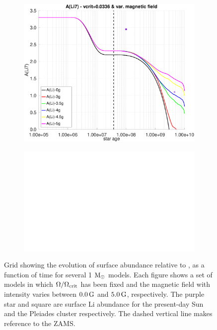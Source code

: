 \documentclass[fleqn,usenatbib]{mnras}
\begin{document}
\begin{figure}
\begin{subfigure}[h]{0.47\textwidth}
    \includegraphics[trim = 25mm 10mm 15mm 10mm, clip,width=\textwidth]{figures/li_vc_0336_var_g.eps}
    \label{fig:subim25}
    \end{subfigure}
    \begin{subfigure}[h]{0.47\textwidth}
    \includegraphics[width=\textwidth]{figures/blank.eps}
    \label{fig:subim26}
    \end{subfigure}
\caption{Grid showing the evolution of surface  abundance relative to , as a function of time for several 1 $\mathrm{M}_\odot$ models. Each figure shows a set of models in which $\Omega / \Omega_{\mathrm{crit}}$ has been fixed and the magnetic field with intensity varies between $0.0\,\mathrm{G}$ and $5.0\,\mathrm{G}$, respectively. The purple star and square are surface Li abundance for the present-day Sun \citep{Asplund2009} and the Pleiades cluster \citep{Sestito2005} respectively. The dashed vertical line makes reference to the ZAMS.}
\label{fig:grid_li_var_g}
\end{figure}
\end{document}
